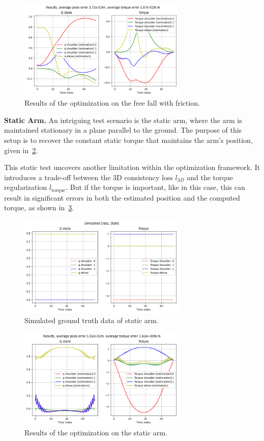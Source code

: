 \begin{figure}
    \centering
    \includegraphics[width=8cm]{figures/free_fall_friction.png}
    \caption{Results of the optimization on the free fall with friction.}
    \label{fig:free_fall_friction}
\end{figure}

\noindent\textbf{Static Arm.} An intriguing test scenario is the static arm, where the arm is 
maintained stationary in a plane parallel to the ground. The purpose of this setup is to recover 
the constant static torque that maintains the arm's position, given in~\cref{fig:static_gt}.

This static test uncovers another limitation within the optimization framework. It introduces a 
trade-off between the 3D consistency loss \(l_{3D}\) and the torque regularization 
\(l_{\text{torque}}\). But if the torque is important, like in this case, this can result in 
significant errors in both the estimated 
position and the computed torque, as shown in~\cref{fig:static}.

\begin{figure}
    \centering
    \includegraphics[width=8cm]{figures/static.png}
    \caption{Simulated ground truth data of static arm.}
    \label{fig:static_gt}
\end{figure}

\begin{figure}
    \centering
    \includegraphics[width=8cm]{figures/static_result.png}
    \caption{Results of the optimization on the static arm.}
    \label{fig:static}
\end{figure}


